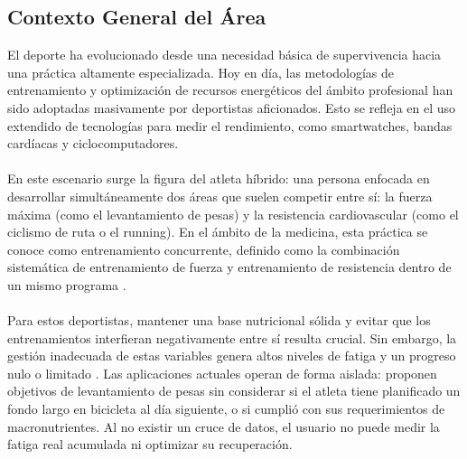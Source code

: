 \documentclass[12pt]{article}
\begin{document}
\subsection{Contexto General del Área}
El deporte ha evolucionado desde una necesidad básica de supervivencia hacia una práctica altamente especializada. Hoy en día, las metodologías de entrenamiento y optimización de recursos energéticos del ámbito profesional han sido adoptadas masivamente por deportistas aficionados. Esto se refleja en el uso extendido de tecnologías para medir el rendimiento, como smartwatches, bandas cardíacas y ciclocomputadores.
\\\\
En este escenario surge la figura del atleta híbrido: una persona enfocada en desarrollar simultáneamente dos áreas que suelen competir entre sí: la fuerza máxima (como el levantamiento de pesas) y la resistencia cardiovascular (como el ciclismo de ruta o el running). En el ámbito de la medicina, esta práctica se conoce como entrenamiento concurrente, definido como la combinación sistemática de entrenamiento de fuerza y entrenamiento de resistencia dentro de un mismo programa \citep{fisiologiadelejercicio}.
\\\\
Para estos deportistas, mantener una base nutricional sólida y evitar que los entrenamientos interfieran negativamente entre sí resulta crucial. Sin embargo, la gestión inadecuada de estas variables genera altos niveles de fatiga y un progreso nulo o limitado \citep{fisiologiadelejercicio}. Las aplicaciones actuales operan de forma aislada: proponen objetivos de levantamiento de pesas sin considerar si el atleta tiene planificado un fondo largo en bicicleta al día siguiente, o si cumplió con sus requerimientos de macronutrientes. Al no existir un cruce de datos, el usuario no puede medir la fatiga real acumulada ni optimizar su recuperación.
\newpage
\end{document}
